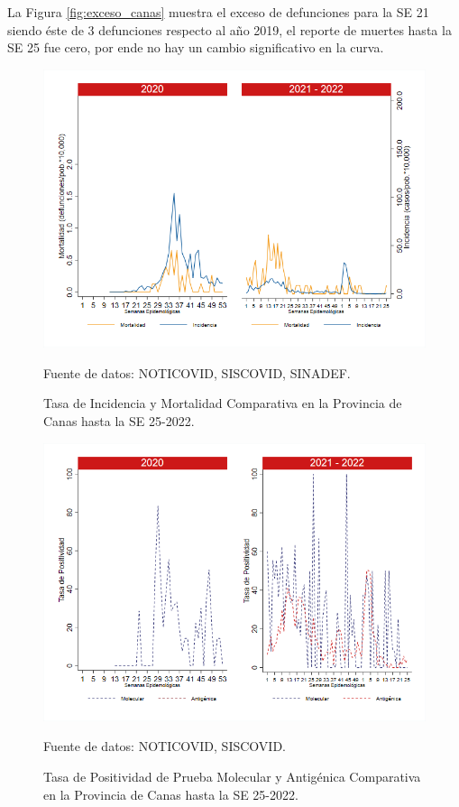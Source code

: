 \documentclass[12pt,a4paper,openany]{book}
\begin{document}
	La Figura \ref{fig:exceso_canas} muestra el exceso de defunciones para la SE 21 siendo éste de 3 defunciones respecto al año 2019, el reporte de muertes hasta la SE 25 fue cero, por ende no hay un cambio significativo en la curva.
	
	\begin{figure}[h]
		\caption{Tasa de Incidencia y Mortalidad Comparativa en la Provincia de Canas hasta la SE 25-2022.}\label{fig:inc_mort_canas}
		\begin{center}
			\includegraphics[width=0.85\linewidth]{../figuras/incidencia_mortalidad_20_21_3.png}
		\end{center}
		{\footnotesize {Fuente de datos: NOTICOVID, SISCOVID, SINADEF.}}
	\end{figure}
	
	\begin{figure}[h]
		\caption{Tasa de Positividad de Prueba Molecular y Antigénica Comparativa en la Provincia de Canas hasta la SE 25-2022.}\label{fig:positividad_canas}
		\begin{center}
			\includegraphics[width=0.7\linewidth]{../figuras/positividad_20_21_3.png}
		\end{center}
		{\footnotesize {Fuente de datos: NOTICOVID, SISCOVID.}}
	\end{figure}
	
\end{document}
